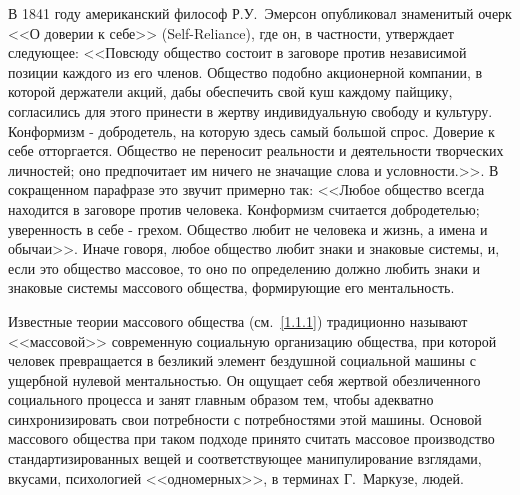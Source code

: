 В 1841 году американский философ Р.У.~Эмерсон опубликовал знаменитый очерк <<О доверии к себе>> (Self-Reliance),
где он, в частности, утверждает следующее: <<Повсюду общество состоит в заговоре против независимой позиции каждого из его членов. Общество подобно акционерной компании, в которой держатели акций, дабы  обеспечить свой куш каждому пайщику, согласились для этого принести в жертву  индивидуальную свободу и культуру. Конформизм  - добродетель, на которую здесь самый большой спрос.  Доверие к себе отторгается. Общество не переносит реальности и деятельности творческих личностей; оно предпочитает им ничего не значащие слова и условности.>>\autocite{emerson1972self}. В сокращенном парафразе это звучит примерно
так: <<Любое общество всегда находится в заговоре против человека. Конформизм считается добродетелью;
уверенность в себе - грехом. Общество любит не человека и жизнь, а имена и обычаи>>. Иначе говоря,
любое общество любит знаки и знаковые системы, и, если это общество массовое, то оно по определению
должно любить знаки и знаковые системы массового общества, формирующие его ментальность.

Известные теории массового общества (см.~\ref{1.1.1}) традиционно называют <<массовой>>
современную социальную организацию общества, при которой человек превращается в безликий
элемент бездушной социальной машины с ущербной нулевой
ментальностью\autocites{macdonald2011}[][3-30]{leavis1930}[][79-202]{eliot2010}. Он
ощущает себя жертвой обезличенного социального процесса и занят главным образом тем, чтобы адекватно
синхронизировать свои потребности с потребностями этой машины. Основой массового общества при таком
подходе принято считать массовое производство стандартизированных вещей и соответствующее
манипулирование взглядами, вкусами, психологией <<одномерных>>, в терминах Г.~Маркузе, людей.

